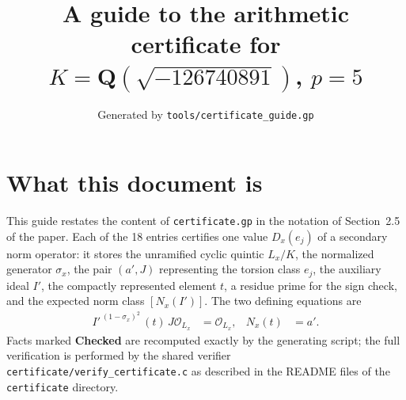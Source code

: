 \documentclass[11pt]{article}
\title{A guide to the arithmetic certificate for $K=\mathbf Q(\sqrt{-126740891})$, $p=5$}
\author{}
\date{Generated by \texttt{tools/certificate\_guide.gp}}
\begin{document}
\maketitle
\section*{What this document is}
This guide restates the content of \texttt{certificate.gp} in the
notation of Section~2.5 of the paper.  Each of the 18 entries
certifies one value $D_x(e_j)$ of a secondary norm operator: it
stores the unramified cyclic quintic $L_x/K$, the normalized
generator $\sigma_x$, the pair $(a',J)$ representing the torsion
class $e_j$, the auxiliary ideal $I'$, the compactly represented
element $t$, a residue prime for the sign check, and the expected
norm class $[N_x(I')]$.  The two defining equations are
\begin{align*}
I'^{\,(1-\sigma_x)^2}\,(t)\,J\mathcal O_{L_x}&=\mathcal O_{L_x},&
N_x(t)&=a'.
\end{align*}
Facts marked \textbf{Checked} are recomputed exactly by the
generating script; the full verification is performed by the
shared verifier \texttt{certificate/verify\_certificate.c} as
described in the README files of the \texttt{certificate}
directory.
\end{document}
